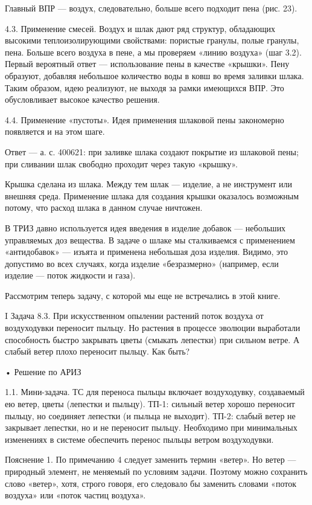 Главный ВПР — воздух, следовательно, больше всего подходит
пена (рис. 23).


4.3. Применение  смесей. Воздух и  шлак дают ряд  структур, обладающих
высокими   теплоизолирующими  свойствами:   пористые  гранулы,   полые
гранулы,  пена. Больше  всего воздуха  в пене,  а мы  проверяем «линию
воздуха»  (шаг 3.2).  Первый вероятный  ответ —  использование пены  в
качестве «крышки». Пену образуют, добавляя небольшое количество воды в
ковш во время заливки шлака.  Таким образом, идею реализуют, не выходя
за рамки имеющихся ВПР. Это обусловливает высокое качество решения.

4.4. Применение  «пустоты». Идея применения шлаковой  пены закономерно
появляется и на этом шаге.

Ответ — а.  с. 400621: при заливке шлака создают  покрытие из шлаковой
пены; при сливании шлак свободно проходит через такую «крышку».

Крышка сделана  из шлака. Между  тем шлак  — изделие, а  не инструмент
или  внешняя среда.  Применение  шлака для  создания крышки  оказалось
возможным потому, что расход шлака в данном случае ничтожен.

В ТРИЗ давно используется идея  введения в изделие добавок — небольших
управляемых  доз  вещества.  В  задаче   о  шлаке  мы  сталкиваемся  с
применением «антидобавок» — изъята и применена небольшая доза изделия.
Видимо,  это допустимо  во всех  случаях, когда  изделие «безразмерно»
(например, если изделие — поток жидкости и газа).


Рассмотрим  теперь задачу,  с которой  мы  еще не  встречались в  этой
книге.




I  Задача  8.3.  При  искусственном опылении  растений  поток  воздуха
от  воздуходувки переносит  пыльцу.  Но растения  в процессе  эволюции
выработали способность  быстро закрывать цветы (смыкать  лепестки) при
сильном ветре. А слабый ветер плохо переносит пыльцу. Как быть?


• Решение по АРИЗ

1.1.  Мини-задача.  ТС  для  переноса  пыльцы  включает  воздуходувку,
создаваемый ею ветер,  цветы (лепестки и пыльцу).  ТП-1: сильный ветер
хорошо переносит пыльцу, но соединяет  лепестки (и пыльца не выходит).
ТП-2: слабый  ветер не закрывает  лепестки, но и не  переносит пыльцу.
Необходимо  при минимальных  изменениях в  системе обеспечить  перенос
пыльцы ветром воздуходувки.

Пояснение 1. По примечанию 4 следует заменить термин «ветер». Но ветер
— природный  элемент, не  меняемый по  условиям задачи.  Поэтому можно
сохранить  слово  «ветер»,  хотя,  строго  говоря,  его  следовало  бы
заменить словами «поток воздуха» или «поток частиц воздуха».

